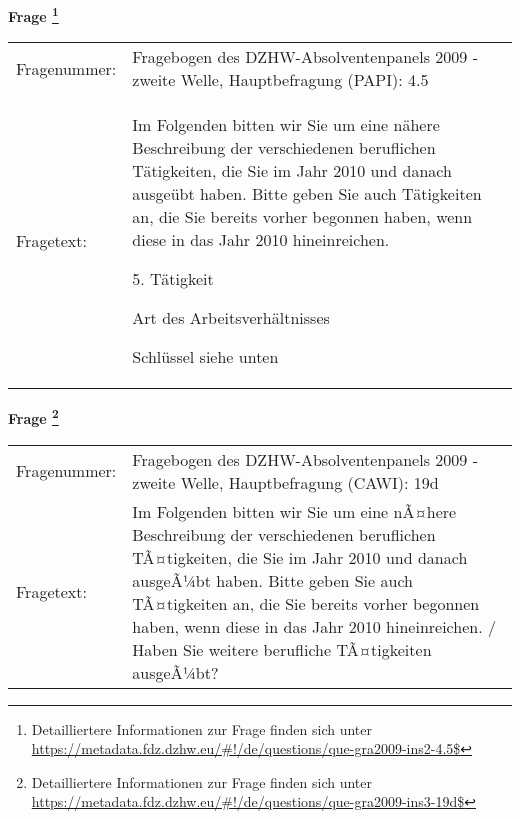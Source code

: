 				\vspace*{0.5cm}
                \noindent\textbf{Frage
	                \footnote{Detailliertere Informationen zur Frage finden sich unter
		              \url{https://metadata.fdz.dzhw.eu/\#!/de/questions/que-gra2009-ins2-4.5$}}}\\
				\begin{tabularx}{\hsize}{@{}lX}
					Fragenummer: &
					  Fragebogen des DZHW-Absolventenpanels 2009 - zweite Welle, Hauptbefragung (PAPI):
					  4.5
 \\
					Fragetext: & Im Folgenden bitten wir Sie um eine nähere Beschreibung der verschiedenen beruflichen Tätigkeiten, die Sie im Jahr 2010 und danach ausgeübt haben. Bitte geben Sie auch Tätigkeiten an, die Sie bereits vorher begonnen haben, wenn diese in das Jahr 2010 hineinreichen.\par  5. Tätigkeit\par  Art des Arbeitsverhältnisses\par  Schlüssel siehe unten \\
				\end{tabularx}
				\vspace*{0.5cm}
                \noindent\textbf{Frage
	                \footnote{Detailliertere Informationen zur Frage finden sich unter
		              \url{https://metadata.fdz.dzhw.eu/\#!/de/questions/que-gra2009-ins3-19d$}}}\\
				\begin{tabularx}{\hsize}{@{}lX}
					Fragenummer: &
					  Fragebogen des DZHW-Absolventenpanels 2009 - zweite Welle, Hauptbefragung (CAWI):
					  19d
 \\
					Fragetext: & Im Folgenden bitten wir Sie um eine nÃ¤here Beschreibung der verschiedenen beruflichen TÃ¤tigkeiten, die Sie im Jahr 2010 und danach ausgeÃ¼bt haben. Bitte geben Sie auch TÃ¤tigkeiten an, die Sie bereits vorher begonnen haben, wenn diese in das Jahr 2010 hineinreichen. / Haben Sie weitere berufliche TÃ¤tigkeiten ausgeÃ¼bt? \\
				\end{tabularx}





